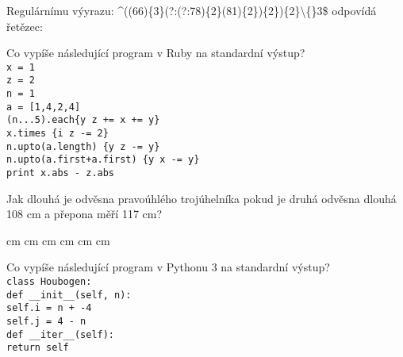 \documentclass[addpoints,12pt]{exam}
\begin{document}
\begin{questions}
Regulárnímu výyrazu: \^{}((66)\{3\}(?:(?:78)\{2\}(81)\{2\})\{2\})\{2\}\textbackslash\{\}3\${} odpovídá řetězec:
\nopagebreak
\begin{choices}
\end{choices}
\question[2]
Co vypíše následující program v Ruby na standardní výstup?\\
\texttt{x = 1\\
z = 2\\
n = 1\\
a = [1,4,2,4]\\
(n...5).each\{\textbar{}y\textbar{} z += x += y\}\\
x.times \{\textbar{}i\textbar{} z -= 2\}\\
n.upto(a.length) \{\textbar{}y\textbar{} z -= y\}\\
n.upto(a.first+a.first) \{\textbar{}y\textbar{} x -= y\}\\
print x.abs - z.abs}
\nopagebreak
\begin{choices}
\end{choices}
\question[2]
Jak dlouhá je odvěsna pravoúhlého trojúhelníka pokud je druhá odvěsna dlouhá 108 cm a přepona měří 117 cm?
\nopagebreak
\begin{choices}
 cm
 cm
 cm
 cm
 cm
 cm
\end{choices}
\question[2]
Co vypíše následující program v Pythonu 3 na standardní výstup?\\
\texttt{class Houbogen:\\
\hspace*{0.6cm}def \_{}\_{}init\_{}\_{}(self, n):\\
\hspace*{0.6cm}\hspace*{0.6cm}self.i = n + -4\\
\hspace*{0.6cm}\hspace*{0.6cm}self.j = 4 - n\\
\hspace*{0.6cm}def \_{}\_{}iter\_{}\_{}(self):\\
\hspace*{0.6cm}\hspace*{0.6cm}return self\\
}
\end{questions}
\end{document}
